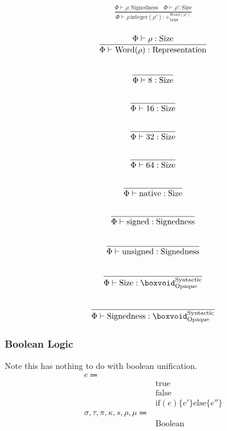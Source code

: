 \documentclass {article}
\begin{document}
\begin{gather*}
\frac
{\Phi \vdash \rho : \text{Signedness} \quad \Phi \vdash \rho' : \text{Size}}
{\Phi \vdash \rho \, \text{integer}(\rho') : +^ {\text{Word} (\rho')}_\texttt{true} } \\
\end{gather*}

\begin{gather*}
\frac
{\Phi \vdash \rho : \text{Size}}
{\Phi \vdash \text{Word} (\rho) : \text{Representation}} \\
\\
\frac
{}
{\Phi \vdash 8 : \text{Size}} \\
\\
\frac
{}
{\Phi \vdash 16 : \text{Size}} \\
\\
\frac
{}
{\Phi \vdash 32 : \text{Size}} \\
\\
\frac
{}
{\Phi \vdash 64 : \text{Size}} \\
\\
\frac
{}
{\Phi \vdash \text{native} : \text{Size}} \\
\\
\frac
{}
{\Phi \vdash \text{signed} : \text{Signedness}} \\
\\
\frac
{}
{\Phi \vdash \text{unsigned} : \text{Signedness}} \\
\\
\frac
{}
{\Phi \vdash \text{Size} : \boxvoid^{\text{Syntactic}}_{\text{Opaque}}} \\
\\
\frac
{}
{\Phi \vdash \text{Signedness} : \boxvoid^{\text{Syntactic}}_{\text{Opaque}}}
\end{gather*}

\subsubsection{Boolean Logic}
Note this has nothing to do with boolean unification.
\begin{align*}
e \Coloneqq & \\
& \text{true} \\
& \text{false} \\
& \text{if} (e) \{ e' \} \text{else} \{ e'' \} \\
\sigma, \tau, \pi, \kappa, s, \rho, \mu \Coloneqq & \\
& \text{Boolean}
\end{align*}
\end{document}
